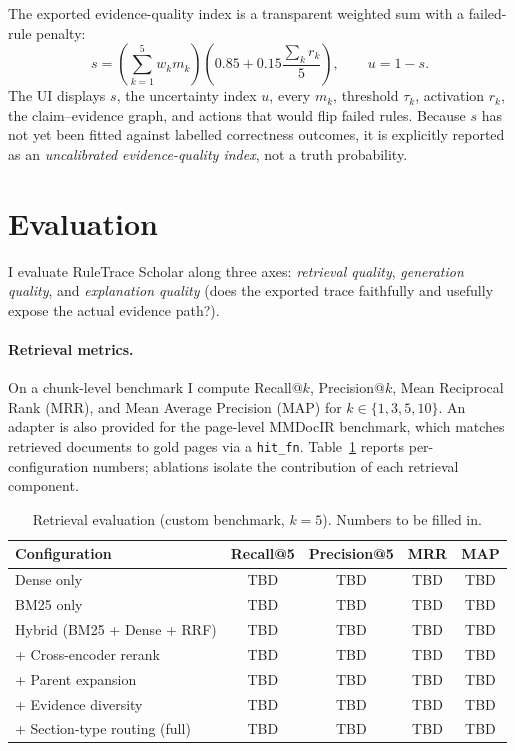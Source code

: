 \documentclass[11pt]{article}
\begin{document}
The exported evidence-quality index is a transparent weighted sum with a failed-rule penalty:
\[
s=\left(\sum_{k=1}^{5}w_km_k\right)\left(0.85+0.15\frac{\sum_k r_k}{5}\right),
\qquad u=1-s.
\]
The UI displays $s$, the uncertainty index $u$, every $m_k$, threshold $\tau_k$, activation $r_k$, the claim--evidence graph, and actions that would flip failed rules. Because $s$ has not yet been fitted against labelled correctness outcomes, it is explicitly reported as an \emph{uncalibrated evidence-quality index}, not a truth probability.

\vspace{-0.3em}
\section{Evaluation}
\label{sec:eval}
\vspace{-0.2em}
I evaluate RuleTrace Scholar along three axes: \emph{retrieval quality}, \emph{generation quality}, and \emph{explanation quality} (does the exported trace faithfully and usefully expose the actual evidence path?).

\paragraph{Retrieval metrics.} On a chunk-level benchmark I compute Recall@$k$, Precision@$k$, Mean Reciprocal Rank (MRR), and Mean Average Precision (MAP) for $k\in\{1,3,5,10\}$. An adapter is also provided for the page-level MMDocIR benchmark, which matches retrieved documents to gold pages via a \texttt{hit\_fn}. Table~\ref{tab:retrieval} reports per-configuration numbers; ablations isolate the contribution of each retrieval component.

\begin{table}[h]
\centering
\small
\caption{Retrieval evaluation (custom benchmark, $k{=}5$). Numbers to be filled in.}
\label{tab:retrieval}
\begin{tabular}{lcccc}
\toprule
Configuration & Recall@5 & Precision@5 & MRR & MAP \\
\midrule
Dense only                                  & TBD & TBD & TBD & TBD \\
BM25 only                                   & TBD & TBD & TBD & TBD \\
Hybrid (BM25 + Dense + RRF)                 & TBD & TBD & TBD & TBD \\
\;\; + Cross-encoder rerank                 & TBD & TBD & TBD & TBD \\
\;\; + Parent expansion                     & TBD & TBD & TBD & TBD \\
\;\; + Evidence diversity                   & TBD & TBD & TBD & TBD \\
\;\; + Section-type routing (full)          & TBD & TBD & TBD & TBD \\
\bottomrule
\end{tabular}
\end{table}
\end{document}
